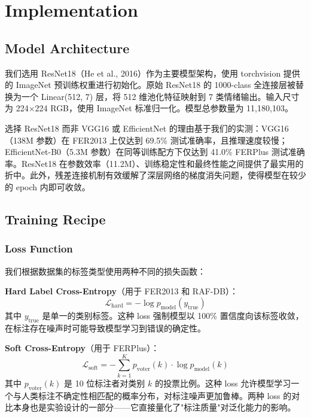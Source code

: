 \documentclass[12pt,a4paper]{article}
\begin{document}
\section{Implementation}

\subsection{Model Architecture}

我们选用 ResNet18（He et al., 2016）作为主要模型架构，使用 torchvision 提供的 ImageNet 预训练权重进行初始化。原始 ResNet18 的 1000-class 全连接层被替换为一个 Linear(512, 7) 层，将 512 维池化特征映射到 7 类情绪输出。输入尺寸为 224×224 RGB，使用 ImageNet 标准归一化。模型总参数量为 11,180,103。

选择 ResNet18 而非 VGG16 或 EfficientNet 的理由基于我们的实测：VGG16（138M 参数）在 FER2013 上仅达到 69.5\% 测试准确率，且推理速度较慢；EfficientNet-B0（5.3M 参数）在同等训练配方下仅达到 41.0\% FERPlus 测试准确率。ResNet18 在参数效率（11.2M）、训练稳定性和最终性能之间提供了最实用的折中。此外，残差连接机制有效缓解了深层网络的梯度消失问题，使得模型在较少的 epoch 内即可收敛。

\subsection{Training Recipe}

\subsubsection{Loss Function}

我们根据数据集的标签类型使用两种不同的损失函数：

\textbf{Hard Label Cross-Entropy}（用于 FER2013 和 RAF-DB）：
\begin{equation}
\mathcal{L}_{\text{hard}} = -\log p_{\text{model}}(y_{\text{true}})
\end{equation}
其中 $y_{\text{true}}$ 是单一的类别标签。这种 loss 强制模型以 100\% 置信度向该标签收敛，在标注存在噪声时可能导致模型学习到错误的确定性。

\textbf{Soft Cross-Entropy}（用于 FERPlus）：
\begin{equation}
\mathcal{L}_{\text{soft}} = -\sum_{k=1}^{K} p_{\text{voter}}(k) \cdot \log p_{\text{model}}(k)
\end{equation}
其中 $p_{\text{voter}}(k)$ 是 10 位标注者对类别 $k$ 的投票比例。这种 loss 允许模型学习一个与人类标注不确定性相匹配的概率分布，对标注噪声更加鲁棒。两种 loss 的对比本身也是实验设计的一部分——它直接量化了"标注质量"对泛化能力的影响。
\end{document}
